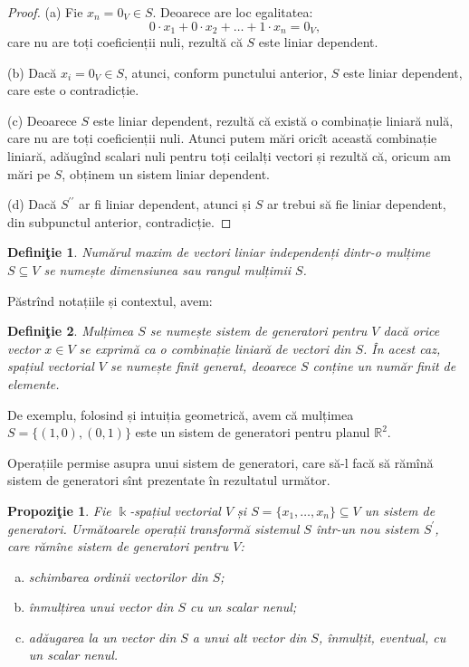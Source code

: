 \documentclass[11pt,a4paper]{article}
\newcommand\seq{\subseteq}
\theoremstyle{dotless}
\newtheorem{proposition}{Propozi\c{t}ie}[section]
\theoremstyle{dotlessdr}
\newtheorem{definition}{Defini\c{t}ie}[section]
\begin{document}
\begin{proof}
(a) Fie $x_n = 0_V \in S$. Deoarece are loc egalitatea: 
\[
0 \cdot x_1 + 0 \cdot x_2 + \dots + 1 \cdot x_n = 0_V,
\]
care nu are toți coeficienții nuli, rezultă că $S$ este liniar dependent.

(b) Dacă $x_i = 0_V \in S$, atunci, conform punctului anterior, $S$ este 
liniar dependent, care este o contradicție.

(c) Deoarece $S$ este liniar dependent, rezultă că există o combinație liniară 
nulă, care nu are toți coeficienții nuli. Atunci putem mări oricît această 
combinație liniară, adăugînd scalari nuli pentru toți ceilalți vectori și 
rezultă că, oricum am mări pe $S$, obținem un sistem liniar dependent.

(d) Dacă $S^{\prime\prime}$ ar fi liniar dependent, atunci și $S$ ar trebui să 
fie liniar dependent, din subpunctul anterior, contradicție.
\end{proof}

\begin{definition}
Numărul maxim de vectori liniar independenți dintr-o mulțime $S \seq V$ se 
numește \emph{dimensiunea} sau \emph{rangul} mulțimii $S$.
\end{definition}

Păstrînd notațiile și contextul, avem:
\begin{definition}
Mulțimea $S$ se numește \emph{sistem de generatori} pentru $V$ dacă orice 
vector $x \in V$ se exprimă ca o combinație liniară de vectori din $S$. În acest
caz, spațiul vectorial $V$ se numește \emph{finit generat}, deoarece $S$ 
conține un număr finit de elemente.
\end{definition}

De exemplu, folosind și intuiția geometrică, avem că mulțimea 
$S = \{(1, 0), (0, 1)\}$ este un sistem de generatori pentru planul 
$\mathbb{R}^2$.

Operațiile permise asupra unui sistem de generatori, care să-l facă să rămînă 
sistem de generatori sînt prezentate în rezultatul următor.

\begin{proposition}
Fie $\Bbbk$-spațiul vectorial $V$ și $S = \{x_1, \dots, x_n\} \seq V$ un 
sistem de generatori. Următoarele operații transformă sistemul $S$ într-un nou 
sistem $S^{\prime}$, care rămîne sistem de generatori pentru $V$:
\begin{enumerate}[(a)]
\item schimbarea ordinii vectorilor din $S$;
\item înmulțirea unui vector din $S$ cu un scalar nenul;
\item adăugarea la un vector din $S$ a unui alt vector din $S$, înmulțit, 
eventual, cu un scalar nenul.
\end{enumerate}
\end{proposition}
\end{document}
